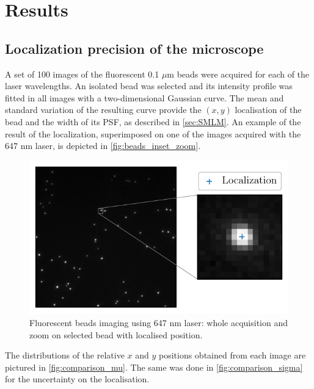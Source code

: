 \section{Results} \label{sec:results}
\subsection{Localization precision of the microscope} \label{sec:results_beads}
A set of 100 images of the fluorescent 0.1 $\mu$m beads were acquired for each of the laser wavelengths.
An isolated bead was selected and its intensity profile was fitted in all images with a two-dimensional Gaussian curve. 
The mean and standard variation of the resulting curve provide the $(x,y)$ localisation of the bead and the width of its PSF, as described in \autoref{sec:SMLM}.
An example of the result of the localization, superimposed on one of the images acquired with the 647 nm laser, is depicted in \autoref{fig:beads_inset_zoom}.
%
\begin{figure}[htbp]
    \centering
    \includegraphics[scale=1]{figures/beads_inset_zoom.pdf}
    \caption{Fluorescent beads imaging using 647 nm laser: whole acquisition  and zoom on selected bead with localised position.}
    \label{fig:beads_inset_zoom}
\end{figure}
%
The distributions of the relative $x$ and $y$ positions obtained from each image are pictured in \autoref{fig:comparison_mu}.
The same was done in \autoref{fig:comparison_sigma} for the uncertainty on the localisation.
%
